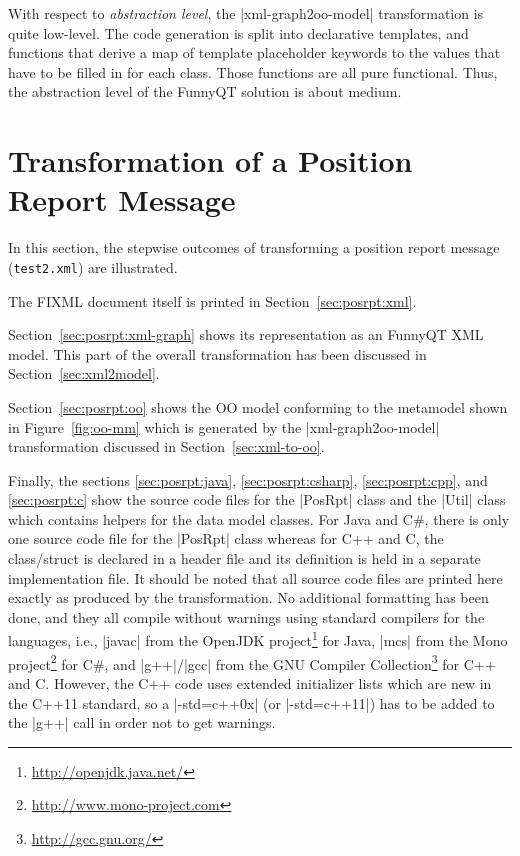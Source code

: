\documentclass[submission]{eptcs}
\newcommand{\code}{\clojureinline}
\begin{document}
With respect to \emph{abstraction level}, the \code|xml-graph2oo-model|
transformation is quite low-level. The code generation is split into
declarative templates, and functions that derive a map of template placeholder
keywords to the values that have to be filled in for each class.  Those
functions are all pure functional.  Thus, the abstraction level of the FunnyQT
solution is about medium.





\newpage
\appendix

\section{Transformation of a Position Report Message}
\label{sec:posrpt}

In this section, the stepwise outcomes of transforming a position report
message (\texttt{test2.xml}) are illustrated.

The FIXML document itself is printed in Section~\ref{sec:posrpt:xml}.

Section~\ref{sec:posrpt:xml-graph} shows its representation as an FunnyQT XML
model.  This part of the overall transformation has been discussed in
Section~\ref{sec:xml2model}.

Section~\ref{sec:posrpt:oo} shows the OO model conforming to the metamodel
shown in Figure~\ref{fig:oo-mm} which is generated by the
\code|xml-graph2oo-model| transformation discussed in
Section~\ref{sec:xml-to-oo}.

Finally, the sections \ref{sec:posrpt:java}, \ref{sec:posrpt:csharp},
\ref{sec:posrpt:cpp}, and \ref{sec:posrpt:c} show the source code files for the
\code|PosRpt| class and the \code|Util| class which contains helpers for the
data model classes.  For Java and C\#, there is only one source code file for
the \code|PosRpt| class whereas for C++ and C, the class/struct is declared in
a header file and its definition is held in a separate implementation file.  It
should be noted that all source code files are printed here exactly as produced
by the transformation.  No additional formatting has been done, and they all
compile without warnings using standard compilers for the languages, i.e.,
\code|javac| from the OpenJDK project\footnote{\url{http://openjdk.java.net/}}
for Java, \code|mcs| from the Mono
project\footnote{\url{http://www.mono-project.com}} for C\#, and
\code|g++|/\code|gcc| from the GNU Compiler
Collection\footnote{\url{http://gcc.gnu.org/}} for C++ and C.  However, the C++
code uses extended initializer lists which are new in the C++11 standard, so a
\code|-std=c++0x| (or \code|-std=c++11|) has to be added to the \code|g++| call
in order not to get warnings.
\end{document}
